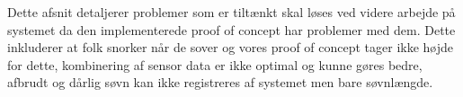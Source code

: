 Dette afsnit detaljerer problemer som er tiltænkt skal løses ved videre arbejde på systemet da den implementerede proof of concept har problemer med dem. Dette inkluderer at folk snorker når de sover og vores proof of concept tager ikke højde for dette, kombinering af sensor data er ikke optimal og kunne gøres bedre, afbrudt og dårlig søvn kan ikke registreres af systemet men bare søvnlængde. 